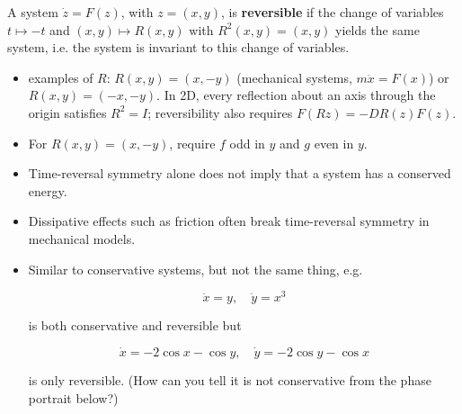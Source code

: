 \documentclass[12pt]{amsart}
\theoremstyle{plain}
\theoremstyle{definition}
\theoremstyle{definition}
\theoremstyle{plain}
\begin{document}
    A system $\dot z=F(z)$, with $z=(x,y)$, is \textbf{reversible} if the change of variables $t\mapsto-t$ and $(x,y)\mapsto R(x,y)$ with
    $R^2(x,y)=(x,y)$ yields the same system, i.e. the system is invariant to this change of
    variables.

    \begin{itemize}

        \item examples of $R$: $R(x,y)=(x,-y)$ (mechanical systems, $m\ddot{x}=F(x)$) or
        $R(x,y)=(-x,-y)$. In 2D, every reflection about an axis through the origin satisfies $R^2=I$; reversibility also requires $F(Rz)=-DR(z)F(z)$.

        \item For $R(x,y)=(x,-y)$, require $f$ odd in $y$ and $g$ even in $y$.

        \item Time-reversal symmetry alone does not imply that a system has a conserved energy.

        \item Dissipative effects such as friction often break time-reversal symmetry in mechanical models.

        \item Similar to conservative systems, but not the same thing, e.g.

        \[
            \dot{x}=y,\quad \dot{y}=x^3
        \]

        is both conservative and reversible but

        \[
            \dot{x}=-2\cos x-\cos y,\quad\dot{y}=-2\cos y-\cos x
        \]

        is only reversible. (How can you tell it is not conservative from the phase portrait below?)

    \end{itemize}
\end{document}
